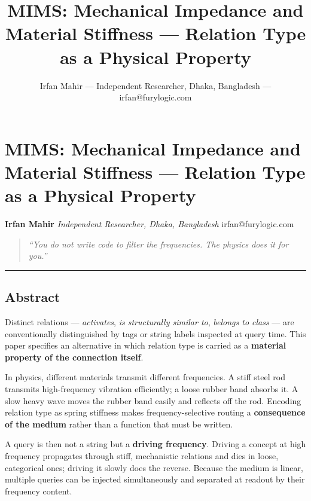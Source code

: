 \documentclass[
  11pt,
  a4paper,
]{article}
\title{MIMS: Mechanical Impedance and Material Stiffness --- Relation
Type as a Physical Property}
\author{Irfan Mahir --- Independent Researcher, Dhaka, Bangladesh ---
irfan@furylogic.com}
\date{}
\begin{document}
\maketitle

{
\hypersetup{linkcolor=}
\setcounter{tocdepth}{3}
\tableofcontents
}
\section{MIMS: Mechanical Impedance and Material Stiffness --- Relation
Type as a Physical
Property}\label{mims-mechanical-impedance-and-material-stiffness-relation-type-as-a-physical-property}

\textbf{Irfan Mahir} \emph{Independent Researcher, Dhaka, Bangladesh}
irfan@furylogic.com

\begin{quote}
\emph{``You do not write code to filter the frequencies. The physics
does it for you.''}
\end{quote}

\begin{center}\rule{0.5\linewidth}{0.5pt}\end{center}

\subsection{Abstract}\label{abstract}

Distinct relations --- \emph{activates}, \emph{is structurally similar
to}, \emph{belongs to class} --- are conventionally distinguished by
tags or string labels inspected at query time. This paper specifies an
alternative in which relation type is carried as a \textbf{material
property of the connection itself}.

In physics, different materials transmit different frequencies. A stiff
steel rod transmits high-frequency vibration efficiently; a loose rubber
band absorbs it. A slow heavy wave moves the rubber band easily and
reflects off the rod. Encoding relation type as spring stiffness makes
frequency-selective routing a \textbf{consequence of the medium} rather
than a function that must be written.

A query is then not a string but a \textbf{driving frequency}. Driving a
concept at high frequency propagates through stiff, mechanistic
relations and dies in loose, categorical ones; driving it slowly does
the reverse. Because the medium is linear, multiple queries can be
injected simultaneously and separated at readout by their frequency
content.
\end{document}
